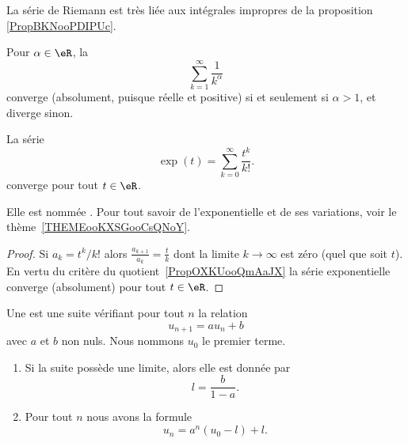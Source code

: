 La série de Riemann est très liée aux intégrales impropres de la proposition \ref{PropBKNooPDIPUc}.
\begin{proposition} \label{PROPooFPVZooGnsqrs}      \label{EXooCTYNooCjYQvJ}
	Pour \( \alpha \in \eR\), la 
	\begin{equation}        \label{EqSerRiem}
		\sum_{k=1}^\infty \frac{ 1 }{ k^{\alpha}}
	\end{equation}
	converge (absolument, puisque réelle et positive) si et seulement si \( \alpha > 1\), et diverge sinon.
\end{proposition}

\begin{lemma} \label{ExIJMHooOEUKfj}
	La série
	\begin{equation}
		\exp(t)=\sum_{k=0}^{\infty}\frac{ t^k }{ k! }.
	\end{equation}
	converge pour tout \( t\in \eR\).

	Elle est nommée . Pour tout savoir de l'exponentielle et de ses variations, voir le thème~\ref{THEMEooKXSGooCsQNoY}.
\end{lemma}

\begin{proof}
	Si \( a_k=t^k/k!\) alors \( \frac{ a_{k+1} }{ a_k }=\frac{ t }{ k }\) dont la limite \( k\to \infty\) est zéro (quel que soit \( t\)). En vertu du critère du quotient~\ref{PropOXKUooQmAaJX} la série exponentielle converge (absolument) pour tout \( t\in \eR\).
\end{proof}

\begin{lemma}      \label{LEMooCVIQooUtuzgE}
	Une  est une suite vérifiant pour tout \( n\) la relation
	\begin{equation}
		u_{n+1}=au_n+b
	\end{equation}
	avec \( a\) et \( b\) non nuls. Nous nommons \( u_0\) le premier terme.

	\begin{enumerate}
		\item
		      Si la suite possède une limite, alors elle est donnée par
		      \begin{equation}    \label{EQooMZSSooOWpZUp}
			      l=\frac{ b }{ 1-a }.
		      \end{equation}
		\item
		      Pour tout \( n\) nous avons la formule
		      \begin{equation}
			      u_n=a^n(u_0-l)+l.
		      \end{equation}
	\end{enumerate}
\end{lemma}


